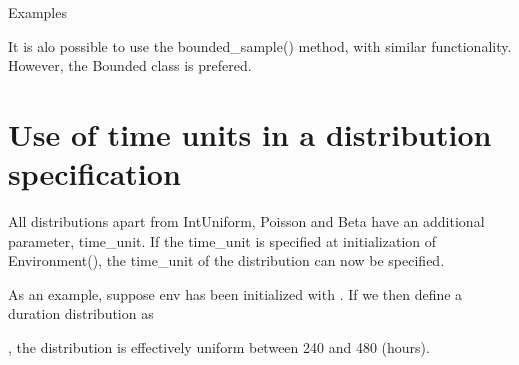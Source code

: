 \documentclass[letterpaper,10pt,english]{sphinxmanual}
\begin{document}
Examples

\begin{sphinxVerbatim}[commandchars=\\\{\}]
    
    
   
   
\end{sphinxVerbatim}

It is alo possible to use the bounded\_sample() method, with similar functionality. However, the Bounded
class is prefered.


\section{Use of time units in a distribution specification}
\label{\detokenize{Distributions:use-of-time-units-in-a-distribution-specification}}
All distributions apart from IntUniform, Poisson and Beta have an additional parameter, time\_unit.
If the time\_unit is specified at initialization of Environment(), the time\_unit of the distribution
can now be specified.

As an example, suppose env has been initialized with .
If we then define a duration distribution as

\begin{sphinxVerbatim}[commandchars=\\\{\}]
    
\end{sphinxVerbatim}

, the distribution is effectively uniform between 240 and 480 (hours).
\end{document}
